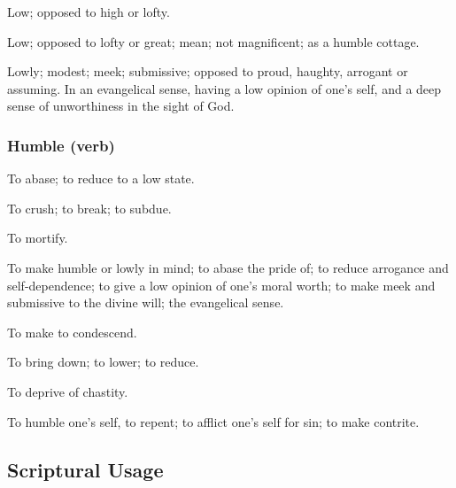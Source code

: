 		\begin{compactitem}
			\item[1] Low; opposed to high or lofty.
			\item[2] Low; opposed to lofty or great; mean; not magnificent; as a humble cottage.
			\item[3] Lowly; modest; meek; submissive; opposed to proud, haughty, arrogant or assuming. In an evangelical sense, having a low opinion of one's self, and a deep sense of unworthiness in the sight of God.
		\end{compactitem}
		
	\subsubsection{Humble (verb)}

		\begin{compactitem}
			\item To abase; to reduce to a low state.
			\item[1] To crush; to break; to subdue.
			\item[2] To mortify.
			\item[3] To make humble or lowly in mind; to abase the pride of; to reduce arrogance and self-dependence; to give a low opinion of one's moral worth; to make meek and submissive to the divine will; the evangelical sense.
			\item[4] To make to condescend.
			\item[5] To bring down; to lower; to reduce.
			\item[6] To deprive of chastity.
			\item To humble one's self, to repent; to afflict one's self for sin; to make contrite.
		\end{compactitem}



\subsection{Scriptural Usage} %
	\label{HUMILITY-SCRIPTURES}

